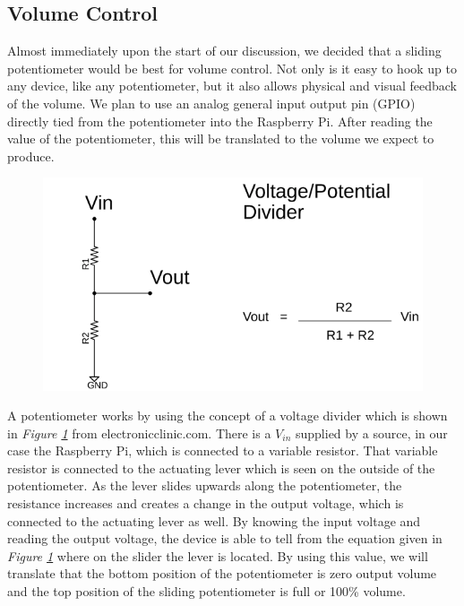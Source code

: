 \subsection{Volume Control}

Almost immediately upon the start of our discussion, we decided that a sliding potentiometer would be best for volume control. Not only is it easy to hook up to any device, like any potentiometer, but it also allows physical and visual feedback of the volume. We plan to use an analog general input output pin (GPIO) directly tied from the potentiometer into the Raspberry Pi. After reading the value of the potentiometer, this will be translated to the volume we expect to produce.

\begin{figure}[h!]
  \centering
  \includegraphics[width=\linewidth]{image/VoltageDiv.png}
  \caption{}
  \label{fig:voltage_div}
\end{figure}

A potentiometer works by using the concept of a voltage divider which is shown in \textit{Figure \ref{fig:voltage_div}} from electronicclinic.com. There is a $ V_{in} $ supplied by a source, in our case the Raspberry Pi, which is connected to a variable resistor. That variable resistor is connected to the actuating lever which is seen on the outside of the potentiometer. As the lever slides upwards along the potentiometer, the resistance increases and creates a change in the output voltage, which is connected to the actuating lever as well. By knowing the input voltage and reading the output voltage, the device is able to tell from the equation given in \textit{Figure \ref{fig:voltage_div}} where on the slider the lever is located. By using this value, we will translate that the bottom position of the potentiometer is zero output volume and the top position of the sliding potentiometer is full or 100\% volume.


